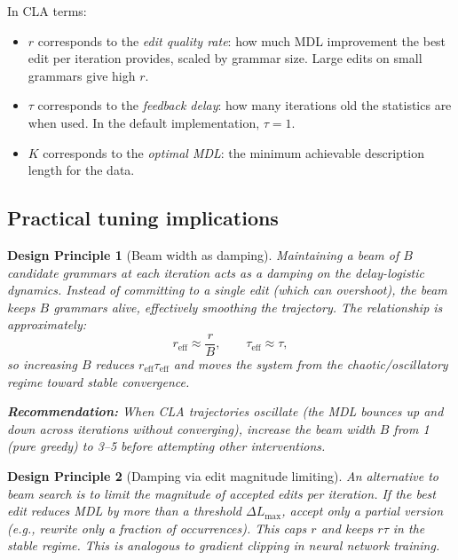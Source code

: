 \documentclass[11pt]{article}
\newtheorem{designprinciple}{Design Principle}
\begin{document}
In CLA terms:
\begin{itemize}
  \item $r$ corresponds to the \emph{edit quality rate}: how much MDL improvement the best edit per iteration provides, scaled by grammar size.  Large edits on small grammars give high $r$.
  \item $\tau$ corresponds to the \emph{feedback delay}: how many iterations old the statistics are when used.  In the default implementation, $\tau = 1$.
  \item $K$ corresponds to the \emph{optimal MDL}: the minimum achievable description length for the data.
\end{itemize}

\subsection{Practical tuning implications}

\begin{designprinciple}[Beam width as damping]
\label{dp:beam-damping}
Maintaining a beam of $B$ candidate grammars at each iteration acts as a \emph{damping} on the delay-logistic dynamics.  Instead of committing to a single edit (which can overshoot), the beam keeps $B$ grammars alive, effectively smoothing the trajectory.  The relationship is approximately:
\begin{equation}
  r_{\text{eff}} \approx \frac{r}{B}, \qquad \tau_{\text{eff}} \approx \tau,
  \end{equation}
so increasing $B$ reduces $r_{\text{eff}} \tau_{\text{eff}}$ and moves the system from the chaotic/oscillatory regime toward stable convergence.

\textbf{Recommendation:} When CLA trajectories oscillate (the MDL bounces up and down across iterations without converging), increase the beam width $B$ from 1 (pure greedy) to 3--5 before attempting other interventions.
\end{designprinciple}

\begin{designprinciple}[Damping via edit magnitude limiting]
\label{dp:edit-limit}
An alternative to beam search is to limit the \emph{magnitude} of accepted edits per iteration.  If the best edit reduces MDL by more than a threshold $\Delta L_{\max}$, accept only a \emph{partial} version (e.g., rewrite only a fraction of occurrences).  This caps $r$ and keeps $r \tau$ in the stable regime.  This is analogous to gradient clipping in neural network training.
\end{designprinciple}
\end{document}
